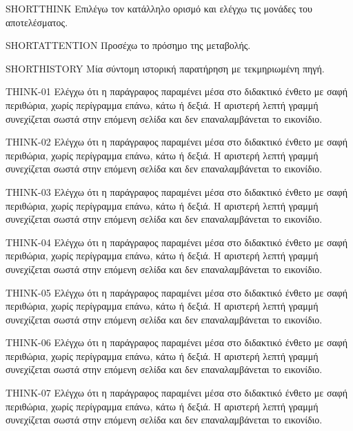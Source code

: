 \pagestyle{empty}
\par\medskip
\begin{ThinkBox}SHORTTHINK Επιλέγω τον κατάλληλο ορισμό και ελέγχω τις μονάδες του αποτελέσματος.\end{ThinkBox}
\begin{AttentionBox}SHORTATTENTION Προσέχω το πρόσημο της μεταβολής.\end{AttentionBox}
\begin{HistoryBox}SHORTHISTORY Μία σύντομη ιστορική παρατήρηση με τεκμηριωμένη πηγή.\par{}\end{HistoryBox}
\clearpage
\begin{ThinkBox}
THINK-01 Ελέγχω ότι η παράγραφος παραμένει μέσα στο διδακτικό ένθετο με σαφή περιθώρια, χωρίς περίγραμμα επάνω, κάτω ή δεξιά. Η αριστερή λεπτή γραμμή συνεχίζεται σωστά στην επόμενη σελίδα και δεν επαναλαμβάνεται το εικονίδιο.\par
THINK-02 Ελέγχω ότι η παράγραφος παραμένει μέσα στο διδακτικό ένθετο με σαφή περιθώρια, χωρίς περίγραμμα επάνω, κάτω ή δεξιά. Η αριστερή λεπτή γραμμή συνεχίζεται σωστά στην επόμενη σελίδα και δεν επαναλαμβάνεται το εικονίδιο.\par
THINK-03 Ελέγχω ότι η παράγραφος παραμένει μέσα στο διδακτικό ένθετο με σαφή περιθώρια, χωρίς περίγραμμα επάνω, κάτω ή δεξιά. Η αριστερή λεπτή γραμμή συνεχίζεται σωστά στην επόμενη σελίδα και δεν επαναλαμβάνεται το εικονίδιο.\par
THINK-04 Ελέγχω ότι η παράγραφος παραμένει μέσα στο διδακτικό ένθετο με σαφή περιθώρια, χωρίς περίγραμμα επάνω, κάτω ή δεξιά. Η αριστερή λεπτή γραμμή συνεχίζεται σωστά στην επόμενη σελίδα και δεν επαναλαμβάνεται το εικονίδιο.\par
THINK-05 Ελέγχω ότι η παράγραφος παραμένει μέσα στο διδακτικό ένθετο με σαφή περιθώρια, χωρίς περίγραμμα επάνω, κάτω ή δεξιά. Η αριστερή λεπτή γραμμή συνεχίζεται σωστά στην επόμενη σελίδα και δεν επαναλαμβάνεται το εικονίδιο.\par
THINK-06 Ελέγχω ότι η παράγραφος παραμένει μέσα στο διδακτικό ένθετο με σαφή περιθώρια, χωρίς περίγραμμα επάνω, κάτω ή δεξιά. Η αριστερή λεπτή γραμμή συνεχίζεται σωστά στην επόμενη σελίδα και δεν επαναλαμβάνεται το εικονίδιο.\par
THINK-07 Ελέγχω ότι η παράγραφος παραμένει μέσα στο διδακτικό ένθετο με σαφή περιθώρια, χωρίς περίγραμμα επάνω, κάτω ή δεξιά. Η αριστερή λεπτή γραμμή συνεχίζεται σωστά στην επόμενη σελίδα και δεν επαναλαμβάνεται το εικονίδιο.\par

\end{ThinkBox}
